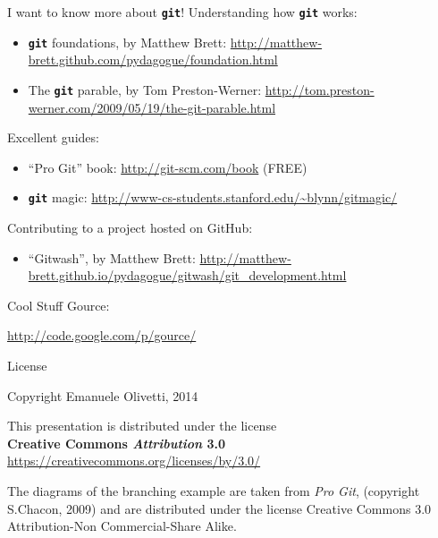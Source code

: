 \documentclass{beamer}
\newcommand{\git}{\texttt{\textbf{git}}\xspace}
\begin{document}
\begin{frame}{I want to know more about \git!}
  Understanding how \git works:
  \begin{itemize}
  \item \git foundations, by Matthew Brett:
    \small
    \url{http://matthew-brett.github.com/pydagogue/foundation.html}
  \item  The \git parable, by Tom Preston-Werner:
    \small
  \url{http://tom.preston-werner.com/2009/05/19/the-git-parable.html}
  \end{itemize}
  Excellent guides:
  \begin{itemize}
  \item ``Pro Git'' book: \url{http://git-scm.com/book} (FREE)
  \item \git magic: \url{http://www-cs-students.stanford.edu/~blynn/gitmagic/}
  \end{itemize}
  Contributing to a project hosted on GitHub:
  \begin{itemize}
  \item ``Gitwash'', by Matthew Brett:
    \small
    \url{http://matthew-brett.github.io/pydagogue/gitwash/git_development.html}
  \end{itemize}
\end{frame}

\begin{frame}{Cool Stuff}
Gource:
  \begin{center}
    \url{http://code.google.com/p/gource/}
  \end{center}
\end{frame}

\begin{frame}{License}
  \begin{center}
    Copyright Emanuele Olivetti, 2014
  \end{center}
  \vspace{1em}
  \begin{center}
    This presentation is distributed under the license\\
    \textbf{Creative Commons \emph{Attribution} 3.0}\\
    \url{https://creativecommons.org/licenses/by/3.0/}
  \end{center}
  \vspace{1em}
  \begin{center}\small
    The diagrams of the branching example are taken from \emph{Pro
      Git}, (copyright S.Chacon, 2009) and are distributed under the
    license Creative Commons 3.0 Attribution-Non Commercial-Share
    Alike.
  \end{center}
\end{frame}
\end{document}
